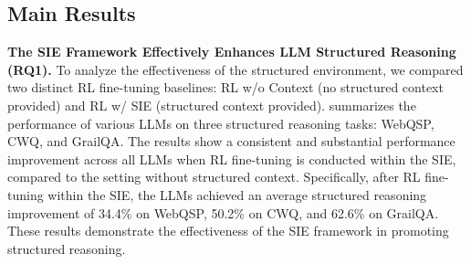 \documentclass{article} %
\begin{document}
\subsection{Main Results}
\textbf{The SIE Framework Effectively Enhances LLM Structured Reasoning (RQ1).} 
To analyze the effectiveness of the structured environment, we compared two distinct RL fine-tuning baselines: RL w/o Context (no structured context provided) and RL w/ SIE (structured context provided). 
 summarizes the performance of various LLMs on three structured reasoning tasks: WebQSP, CWQ, and GrailQA. The results show a consistent and substantial performance improvement across all LLMs when RL fine-tuning is conducted within the SIE, compared to the setting without structured context. 
Specifically, after RL fine-tuning within the SIE, the LLMs achieved an average structured reasoning improvement of 34.4\% on WebQSP, 50.2\% on CWQ, and 62.6\% on GrailQA. These results demonstrate the effectiveness of the SIE framework in promoting structured reasoning. 

\begin{table}[!t]
\centering
\caption{Structured reasoning evaluation under different RL fine-tuning settings. The red number in parentheses indicates the performance gains of RL w/ SIE over RL w/o Context. RL within the SIE significantly surpasses RL without a structured context, demonstrating the \textbf{effectiveness} of SIE.}
\vspace{-10pt}
\label{tab:my_label_modified}
\end{table}
\end{document}
